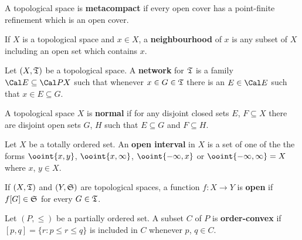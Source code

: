 
 A topological space is
{\bf metacompact} if every open
cover has a point-finite refinement which is an open cover.



 If $X$ is a topological space and $x\in X$, a
{\bf
neighbourhood} of $x$ is any subset of $X$ including an open set which
contains $x$.

 Let $(X,\frak T)$ be a topological space.   A
{\bf network} for $\frak T$ is a family $\Cal E\subseteq\Cal PX$ such
that whenever $x\in G\in\frak T$ there is an $E\in\Cal E$ such that
$x\in E\subseteq G$.

 A topological space $X$ is {\bf normal} if for any
disjoint
closed sets $E$, $F\subseteq X$ there are disjoint open sets $G$, $H$
such that $E\subseteq G$ and $F\subseteq H$.   

 Let $X$ be a totally ordered set.   An
{\bf open interval} in $X$ is a set of one of the the forms
$\ooint{x,y}$, $\ooint{x,\infty}$, $\ooint{-\infty,x}$ or
$\ooint{-\infty,\infty}=X$ where $x$, $y\in X$.

 If $(X,\frak T)$ and $(Y,\frak S)$ are topological
spaces, a function $f:X\to Y$ is {\bf open} if $f[G]\in\frak S$ for
every $G\in\frak T$.

 Let $(P,\le)$ be a partially ordered set.   A
subset $C$ of $P$ is {\bf order-convex} if
$[p,q]=\{r:p\le r\le q\}$ is included in $C$ whenever $p$, $q\in C$.


